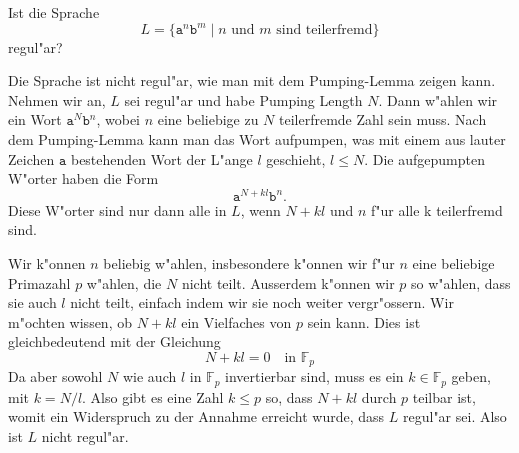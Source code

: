 Ist die Sprache 
\[
L=\{\texttt{a}^n\texttt{b}^m\;|\; \text{$n$ und $m$ sind teilerfremd}\}
\]
regul"ar?

\begin{loesung}
Die Sprache ist nicht regul"ar, wie man mit dem Pumping-Lemma zeigen
kann. Nehmen wir an, $L$ sei regul"ar und habe Pumping Length $N$.
Dann w"ahlen wir ein Wort $\texttt{a}^N\texttt{b}^n$, wobei
$n$ eine beliebige zu $N$ teilerfremde Zahl sein muss.
Nach dem Pumping-Lemma kann man das Wort aufpumpen, was mit einem
aus lauter Zeichen $\texttt{a}$ bestehenden Wort der L"ange $l$
geschieht, $l\le N$. Die aufgepumpten W"orter haben die Form
\[
\texttt{a}^{N+kl}\texttt{b}^n.
\]
Diese W"orter sind nur dann alle in $L$, wenn $N+kl$ und $n$ f"ur alle k
teilerfremd sind.

Wir k"onnen $n$ beliebig w"ahlen, insbesondere k"onnen wir f"ur $n$ eine
beliebige Primazahl $p$ w"ahlen, die $N$ nicht teilt. Ausserdem k"onnen
wir $p$ so w"ahlen, dass sie auch $l$ nicht teilt, einfach indem
wir sie noch weiter vergr"ossern. Wir m"ochten wissen, ob $N+kl$ ein
Vielfaches von $p$ sein kann. Dies ist gleichbedeutend mit der Gleichung
\[
N+kl=0\quad \text{in $\mathbb F_p$}
\]
Da aber sowohl $N$ wie auch $l$ in $\mathbb F_p$ invertierbar sind,
muss es ein $k\in\mathbb F_p$ geben, mit $k=N/l$. Also gibt es eine 
Zahl $k\le p$ so, dass $N+kl$ durch $p$ teilbar ist, womit ein Widerspruch
zu der Annahme erreicht wurde, dass $L$ regul"ar sei. Also ist $L$
nicht regul"ar.
\end{loesung}

